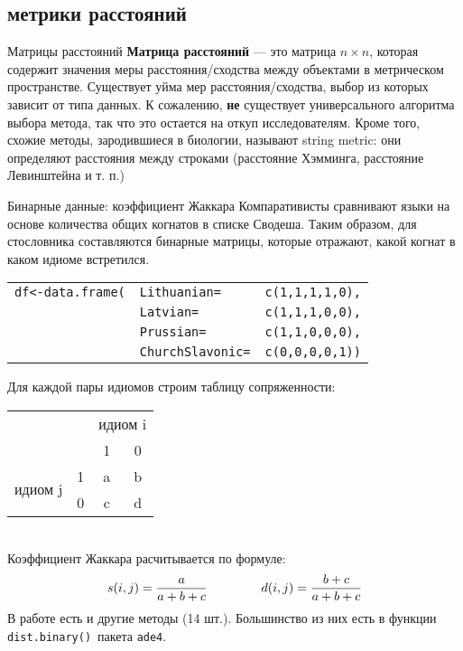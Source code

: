 \subsection{метрики расстояний}
\begin{frame}{Матрицы расстояний}
\textbf{Матрица расстояний} — это матрица $n\times n$, которая содержит значения меры расстояния/сходства между объектами в метрическом пространстве. Существует уйма мер расстояния/сходства, выбор из которых зависит от типа данных. К сожалению, \textbf{не} существует универсального алгоритма выбора метода, так что это остается на откуп исследователям. Кроме того, схожие методы, зародившиеся в биологии, называют string metric: они определяют расстояния между строками (расстояние Хэмминга, расстояние Левинштейна и т. п.)
\end{frame}
\begin{frame}{Бинарные данные: коэффициент Жаккара}
Компаративисты сравнивают языки на основе количества общих когнатов в списке Сводеша. Таким образом, для стословника составляются бинарные матрицы, которые отражают, какой когнат в каком идиоме встретился.
\scriptsize
\begin{alltt}
\begin{tabular}{lll}
df <- data.frame(& Lithuanian = & c(1, 1, 1, 1, 0), \\ 
 & Latvian = & c(1, 1, 1, 0, 0), \\ 
 & Prussian = & c(1, 1, 0, 0, 0), \\ 
 & ChurchSlavonic = & c(0, 0, 0, 0, 1)) \\ 
\end{tabular}
\end{alltt}
\normalsize
Для каждой пары идиомов строим таблицу сопряженности:\\
\hfill
\scriptsize
\begin{tabular}{|c|c|c|c|}
\hline
 \multicolumn{ 2}{|c|}{}  & \multicolumn{ 2}{c|}{идиом i} \\ \cline{ 3- 4}
 \multicolumn{ 2}{|c|}{}  & 1 & 0 \\ \hline
\multirow{2}{*}{идиом j} & 1 & a & b \\ \cline{ 2- 4}
\multicolumn{ 1}{|c|}{} & 0 & c & d \\ \hline
\end{tabular}
\normalsize
\hfill ~\\
Коэффициент Жаккара расчитывается по формуле:\\
$$s(i, j) = \frac{a}{a+b+c} \hspace{15mm} d(i, j) = \frac{b+c}{a+b+c}$$
В работе \citep{gower86} есть и другие методы (14 шт.). Большинство из них есть в функции \scriptsize\verb"dist.binary()"\normalsize\ пакета \scriptsize\verb"ade4"\normalsize.
\end{frame}
